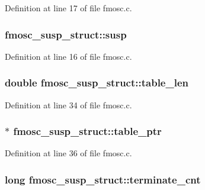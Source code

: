 Definition at line 17 of file fmosc.\+c.

\subsubsection[{\texorpdfstring{susp}{susp}}]{ fmosc\+\_\+susp\+\_\+struct\+::susp}\hypertarget{structfmosc__susp__struct_a8aa3a6dd8fb065ffa4b522dd3048bd32}{}\label{structfmosc__susp__struct_a8aa3a6dd8fb065ffa4b522dd3048bd32}


Definition at line 16 of file fmosc.\+c.

\subsubsection[{\texorpdfstring{table\+\_\+len}{table_len}}]{\setlength{\rightskip}{0pt plus 5cm}double fmosc\+\_\+susp\+\_\+struct\+::table\+\_\+len}\hypertarget{structfmosc__susp__struct_ad28ab2eb67e016ec5dd682f840564b08}{}\label{structfmosc__susp__struct_ad28ab2eb67e016ec5dd682f840564b08}


Definition at line 34 of file fmosc.\+c.

\subsubsection[{\texorpdfstring{table\+\_\+ptr}{table_ptr}}]{$\ast$ fmosc\+\_\+susp\+\_\+struct\+::table\+\_\+ptr}\hypertarget{structfmosc__susp__struct_afa092daefc48c88e718b7c7d2cf77d06}{}\label{structfmosc__susp__struct_afa092daefc48c88e718b7c7d2cf77d06}


Definition at line 36 of file fmosc.\+c.

\subsubsection[{\texorpdfstring{terminate\+\_\+cnt}{terminate_cnt}}]{\setlength{\rightskip}{0pt plus 5cm}long fmosc\+\_\+susp\+\_\+struct\+::terminate\+\_\+cnt}\hypertarget{structfmosc__susp__struct_a7e984fb12fa0074c3ae7d18a5c9b49d9}{}\label{structfmosc__susp__struct_a7e984fb12fa0074c3ae7d18a5c9b49d9}


